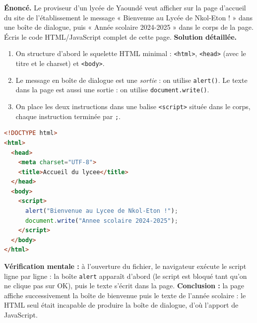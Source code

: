 \documentclass[11pt]{article}
\begin{document}
\begin{exoresolu}
\textbf{Énoncé.} Le proviseur d'un lycée de Yaoundé veut afficher sur la page d'accueil du site de l'établissement le message « Bienvenue au Lycée de Nkol-Eton ! » dans une boîte de dialogue, puis « Année scolaire 2024-2025 » dans le corps de la page. Écris le code HTML/JavaScript complet de cette page.
\tcblower
\textbf{Solution détaillée.}
\begin{enumerate}
  \item On structure d'abord le squelette HTML minimal : \texttt{<html>}, \texttt{<head>} (avec le titre et le charset) et \texttt{<body>}.
  \item Le message en boîte de dialogue est une \emph{sortie} : on utilise \texttt{alert()}. Le texte dans la page est aussi une sortie : on utilise \texttt{document.write()}.
  \item On place les deux instructions dans une balise \texttt{<script>} située dans le corps, chaque instruction terminée par \texttt{;}.
\end{enumerate}
\begin{lstlisting}[language=HTML]
<!DOCTYPE html>
<html>
  <head>
    <meta charset="UTF-8">
    <title>Accueil du lycee</title>
  </head>
  <body>
    <script>
      alert("Bienvenue au Lycee de Nkol-Eton !");
      document.write("Annee scolaire 2024-2025");
    </script>
  </body>
</html>
\end{lstlisting}
\textbf{Vérification mentale :} à l'ouverture du fichier, le navigateur exécute le script ligne par ligne : la boîte \texttt{alert} apparaît d'abord (le script est bloqué tant qu'on ne clique pas sur OK), puis le texte s'écrit dans la page.
\textbf{Conclusion :} la page affiche successivement la boîte de bienvenue puis le texte de l'année scolaire : le HTML seul était incapable de produire la boîte de dialogue, d'où l'apport de JavaScript.
\end{exoresolu}
\end{document}
